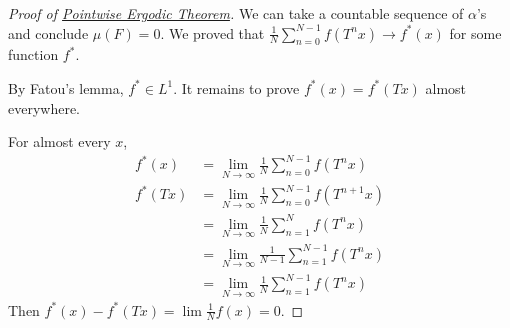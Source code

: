 \documentclass{article}
\begin{document}
\begin{proof}[Proof of \hyperlink{thm:pet}{Pointwise Ergodic Theorem}]
  We can take a countable sequence of $\alpha$'s and conclude $\mu(F) = 0$.
  We proved that $\frac{1}{N} \sum_{n=0}^{N-1} f(T^n x) \to f^*(x)$ for some function $f^*$.

  By Fatou's lemma, $f^* \in L^1$.
  It remains to prove $f^*(x) = f^*(Tx)$ almost everywhere.

  For almost every $x$,
  \begin{align*}
    f^*(x) &= \lim_{N \to \infty} \frac{1}{N} \sum_{n=0}^{N-1} f(T^n x) \\
    f^*(Tx) &= \lim_{N \to \infty} \frac{1}{N} \sum_{n=0}^{N-1} f(T^{n+1} x) \\
     &= \lim_{N \to \infty} \frac{1}{N} \sum_{n=1}^{N} f(T^n x) \\
     &= \lim_{N \to \infty} \frac{1}{N-1} \sum_{n=1}^{N-1} f(T^n x) \\
     &= \lim_{N \to \infty} \frac{1}{N} \sum_{n=1}^{N-1} f(T^n x)
  \end{align*}
  Then $f^*(x) - f^*(Tx) = \lim \frac{1}{N} f(x) = 0$.
\end{proof}

\clearpage
\end{document}
